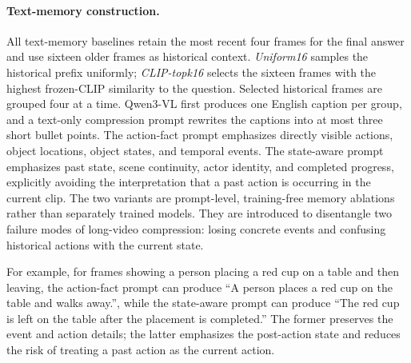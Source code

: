 \paragraph{Text-memory construction.}
All text-memory baselines retain the most recent four frames for the final answer and use sixteen
older frames as historical context. \textit{Uniform16} samples the historical prefix uniformly;
\textit{CLIP-topk16} selects the sixteen frames with the highest frozen-CLIP similarity to the
question. Selected historical frames are grouped four at a time. Qwen3-VL first produces one
English caption per group, and a text-only compression prompt rewrites the captions into at most
three short bullet points. The action-fact prompt emphasizes directly visible actions, object
locations, object states, and temporal events. The state-aware prompt emphasizes past state,
scene continuity, actor identity, and completed progress, explicitly avoiding the interpretation
that a past action is occurring in the current clip. The two variants are prompt-level,
training-free memory ablations rather than separately trained models.
They are introduced to disentangle two failure modes of long-video compression: losing concrete
events and confusing historical actions with the current state.

For example, for frames showing a person placing a red cup on a table and then leaving, the
action-fact prompt can produce ``A person places a red cup on the table and walks away.'', while
the state-aware prompt can produce ``The red cup is left on the table after the placement is
completed.'' The former preserves the event and action details; the latter emphasizes the
post-action state and reduces the risk of treating a past action as the current action.

